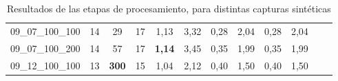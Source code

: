 \begin{table}[ht!]
{\begin{tabular}{cccc|c|c|c|c|c|c|ll}
			\multicolumn{1}{|c|}{09\_07\_100\_100}  & \multicolumn{1}{c|}{14}         & \multicolumn{1}{c|}{29}     & 17      & 1,13 & 3,32  & 0,28     & 2,04  & 0,28     & 2,04  &  &  \\ \cline{1-10}
			\multicolumn{1}{|c|}{09\_07\_100\_200}  & \multicolumn{1}{c|}{14}         & \multicolumn{1}{c|}{57}     & 17      & \textbf{1,14} & 3,45  & 0,35     & 1,99  & 0,35     & 1,99  &  &  \\ \cline{1-10}
			\multicolumn{1}{|c|}{09\_12\_100\_100}  & \multicolumn{1}{c|}{13}         & \multicolumn{1}{c|}{\textbf{300}}    & 15      & 1,04 & 2,12   & 0,40     & 1,50  & 0,40     & 1,50  &  &  \\ \cline{1-10}
		\end{tabular}
	}
	\caption{Resultados de las etapas de procesamiento, para distintas capturas sintéticas}
	\label{resultados_distintas_capturas}
\end{table}



